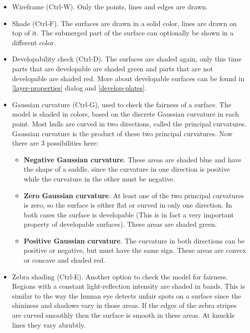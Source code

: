 \documentclass[12pt]{article}
\begin{document}
\begin{itemize}

  \item Wireframe (Ctrl-W). Only the points, lines and edges are drawn.

  \item Shade (Ctrl-F). The surfaces are drawn in a solid color, lines
are drawn on top of it. The submerged part of the surface can
optionally be shown in a different color.

  \item Developability check (Ctrl-D). The surfaces are shaded again,
only this time parts that are developable are shaded green and parts
that are not developable are shaded red. More about developable
surfaces can be found in \ref{layer-properties} dialog
and \ref{develop-plates}.

  \item Gaussian curvature (Ctrl-G), used to check the fairness of a
surface. The model is shaded in colors, based on the discrete Gaussian
curvature in each point. Most hulls are curved in two directions,
called the principal curvatures.  Gaussian curvature is the product of
these two principal curvatures. Now there are 3 possibilities here:

  \begin{itemize}

    \item \textbf{Negative Gaussian curvature}. These areas are shaded blue and
have the shape of a saddle, since the curvature in one direction is
positive while the curvature in the other must be negative.

    \item \textbf{Zero Gaussian curvature}. At least one of the two principal
curvatures is zero, so the surface is either flat or curved in only
one direction. In both cases the surface is developable (This is in
fact a very important property of developable surfaces). These areas
are shaded green.

    \item \textbf{Positive Gaussian curvature}. The curvature in both
directions can be positive or negative, but must have the same
sign. These areas are convex or concave and shaded red.

  \end{itemize}

  \item Zebra shading (Ctrl-E). Another option to check the model for
fairness. Regions with a constant light-reflection intensity are
shaded in bands. This is similar to the way the human eye detects
unfair spots on a surface since the shininess and shadows vary in
those areas. If the edges of the zebra stripes are curved smoothly
then the surface is smooth in these areas. At knuckle lines they vary
abrubtly.

\end{itemize}
\end{document}
